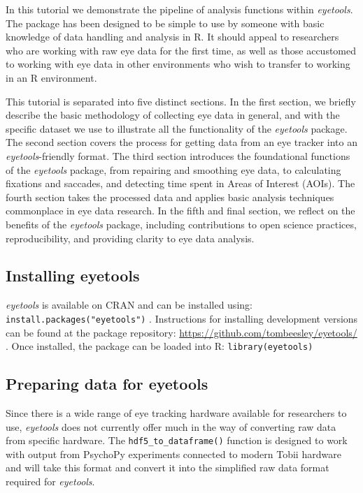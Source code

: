 \documentclass[
  man,
  floatsintext,
  longtable,
  nolmodern,
  notxfonts,
  notimes,
  colorlinks=true,linkcolor=blue,citecolor=blue,urlcolor=blue]{apa7}
\begin{document}
In this tutorial we demonstrate the pipeline of analysis functions
within \emph{eyetools}. The package has been designed to be simple to
use by someone with basic knowledge of data handling and analysis in R.
It should appeal to researchers who are working with raw eye data for
the first time, as well as those accustomed to working with eye data in
other environments who wish to transfer to working in an R environment.

This tutorial is separated into five distinct sections. In the first
section, we briefly describe the basic methodology of collecting eye
data in general, and with the specific dataset we use to illustrate all
the functionality of the \emph{eyetools} package. The second section
covers the process for getting data from an eye tracker into an
\emph{eyetools}-friendly format. The third section introduces the
foundational functions of the \emph{eyetools} package, from repairing
and smoothing eye data, to calculating fixations and saccades, and
detecting time spent in Areas of Interest (AOIs). The fourth section
takes the processed data and applies basic analysis techniques
commonplace in eye data research. In the fifth and final section, we
reflect on the benefits of the \emph{eyetools} package, including
contributions to open science practices, reproducibility, and providing
clarity to eye data analysis.

\subsection{Installing eyetools}\label{installing-eyetools}

\emph{eyetools} is available on CRAN and can be installed using:
\texttt{install.packages("eyetools")} . Instructions for installing
development versions can be found at the package repository:
\url{https://github.com/tombeesley/eyetools/} . Once installed, the
package can be loaded into R: \texttt{library(eyetools)}

\subsection{Preparing data for
eyetools}\label{preparing-data-for-eyetools}

Since there is a wide range of eye tracking hardware available for
researchers to use, \emph{eyetools} does not currently offer much in the
way of converting raw data from specific hardware. The
\texttt{hdf5\_to\_dataframe()} function is designed to work with output
from PsychoPy experiments connected to modern Tobii hardware and will
take this format and convert it into the simplified raw data format
required for \emph{eyetools}.
\end{document}
